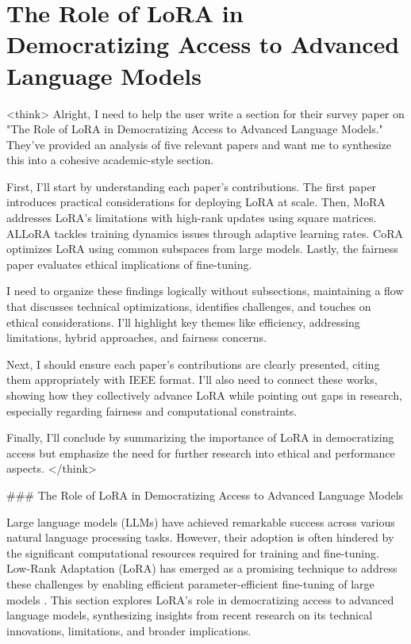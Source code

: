 \documentclass[conference]{IEEEtran}
\begin{document}
\section{The Role of LoRA in Democratizing Access to Advanced Language Models}
<think>
Alright, I need to help the user write a section for their survey paper on "The Role of LoRA in Democratizing Access to Advanced Language Models." They've provided an analysis of five relevant papers and want me to synthesize this into a cohesive academic-style section.

First, I'll start by understanding each paper's contributions. The first paper introduces practical considerations for deploying LoRA at scale. Then, MoRA addresses LoRA's limitations with high-rank updates using square matrices. ALLoRA tackles training dynamics issues through adaptive learning rates. CoRA optimizes LoRA using common subspaces from large models. Lastly, the fairness paper evaluates ethical implications of fine-tuning.

I need to organize these findings logically without subsections, maintaining a flow that discusses technical optimizations, identifies challenges, and touches on ethical considerations. I'll highlight key themes like efficiency, addressing limitations, hybrid approaches, and fairness concerns.

Next, I should ensure each paper's contributions are clearly presented, citing them appropriately with IEEE format. I'll also need to connect these works, showing how they collectively advance LoRA while pointing out gaps in research, especially regarding fairness and computational constraints.

Finally, I'll conclude by summarizing the importance of LoRA in democratizing access but emphasize the need for further research into ethical and performance aspects.
</think>

### The Role of LoRA in Democratizing Access to Advanced Language Models

Large language models (LLMs) have achieved remarkable success across various natural language processing tasks. However, their adoption is often hindered by the significant computational resources required for training and fine-tuning. Low-Rank Adaptation (LoRA) has emerged as a promising technique to address these challenges by enabling efficient parameter-efficient fine-tuning of large models \cite{b1}. This section explores LoRA's role in democratizing access to advanced language models, synthesizing insights from recent research on its technical innovations, limitations, and broader implications.
\end{document}
